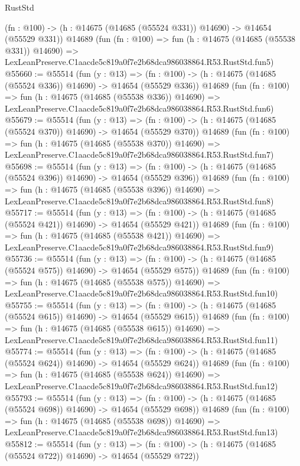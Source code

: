 \begin{lexlean}{RustStd}
\begin{coremodule}
    (fn : @100) -> (h : @14675 (@14685 (@55524 @331)) @14690) -> @14654 (@55529 @331))
    @14689
    (fun (fn : @100) =>
    fun (h : @14675 (@14685 (@55538 @331)) @14690) =>
    LexLeanPreserve.C1aacde5c819a0f7e2b68dca986038864.R53.RustStd.fun5)
@55660 := @55514
    (fun (y : @13) =>
    (fn : @100) -> (h : @14675 (@14685 (@55524 @336)) @14690) -> @14654 (@55529 @336))
    @14689
    (fun (fn : @100) =>
    fun (h : @14675 (@14685 (@55538 @336)) @14690) =>
    LexLeanPreserve.C1aacde5c819a0f7e2b68dca986038864.R53.RustStd.fun6)
@55679 := @55514
    (fun (y : @13) =>
    (fn : @100) -> (h : @14675 (@14685 (@55524 @370)) @14690) -> @14654 (@55529 @370))
    @14689
    (fun (fn : @100) =>
    fun (h : @14675 (@14685 (@55538 @370)) @14690) =>
    LexLeanPreserve.C1aacde5c819a0f7e2b68dca986038864.R53.RustStd.fun7)
@55698 := @55514
    (fun (y : @13) =>
    (fn : @100) -> (h : @14675 (@14685 (@55524 @396)) @14690) -> @14654 (@55529 @396))
    @14689
    (fun (fn : @100) =>
    fun (h : @14675 (@14685 (@55538 @396)) @14690) =>
    LexLeanPreserve.C1aacde5c819a0f7e2b68dca986038864.R53.RustStd.fun8)
@55717 := @55514
    (fun (y : @13) =>
    (fn : @100) -> (h : @14675 (@14685 (@55524 @421)) @14690) -> @14654 (@55529 @421))
    @14689
    (fun (fn : @100) =>
    fun (h : @14675 (@14685 (@55538 @421)) @14690) =>
    LexLeanPreserve.C1aacde5c819a0f7e2b68dca986038864.R53.RustStd.fun9)
@55736 := @55514
    (fun (y : @13) =>
    (fn : @100) -> (h : @14675 (@14685 (@55524 @575)) @14690) -> @14654 (@55529 @575))
    @14689
    (fun (fn : @100) =>
    fun (h : @14675 (@14685 (@55538 @575)) @14690) =>
    LexLeanPreserve.C1aacde5c819a0f7e2b68dca986038864.R53.RustStd.fun10)
@55755 := @55514
    (fun (y : @13) =>
    (fn : @100) -> (h : @14675 (@14685 (@55524 @615)) @14690) -> @14654 (@55529 @615))
    @14689
    (fun (fn : @100) =>
    fun (h : @14675 (@14685 (@55538 @615)) @14690) =>
    LexLeanPreserve.C1aacde5c819a0f7e2b68dca986038864.R53.RustStd.fun11)
@55774 := @55514
    (fun (y : @13) =>
    (fn : @100) -> (h : @14675 (@14685 (@55524 @624)) @14690) -> @14654 (@55529 @624))
    @14689
    (fun (fn : @100) =>
    fun (h : @14675 (@14685 (@55538 @624)) @14690) =>
    LexLeanPreserve.C1aacde5c819a0f7e2b68dca986038864.R53.RustStd.fun12)
@55793 := @55514
    (fun (y : @13) =>
    (fn : @100) -> (h : @14675 (@14685 (@55524 @698)) @14690) -> @14654 (@55529 @698))
    @14689
    (fun (fn : @100) =>
    fun (h : @14675 (@14685 (@55538 @698)) @14690) =>
    LexLeanPreserve.C1aacde5c819a0f7e2b68dca986038864.R53.RustStd.fun13)
@55812 := @55514
    (fun (y : @13) =>
    (fn : @100) -> (h : @14675 (@14685 (@55524 @722)) @14690) -> @14654 (@55529 @722))

\end{coremodule}
\end{lexlean}
